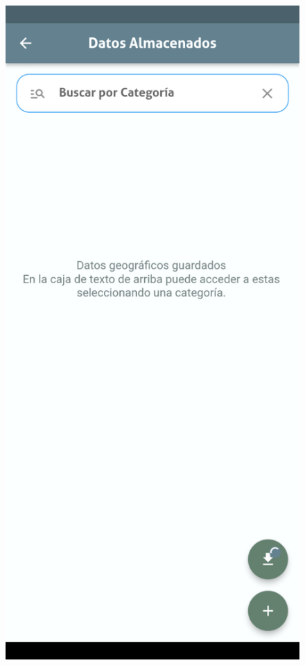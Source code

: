 \documentclass{article}
\begin{document}
\begin{figure}[H]
  \centering
  \begin{minipage}[b]{0.3\textwidth}
    \centering
    \includegraphics[width=\textwidth]{images/functionality_test/geodata_exporter1.png}

\end{minipage}
\end{figure}
\end{document}
